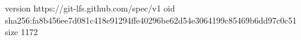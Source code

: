 version https://git-lfs.github.com/spec/v1
oid sha256:fa8b456ee7d081c418e91294ffe40296be62d54e3064199c85469b6dd97c0c51
size 1172
